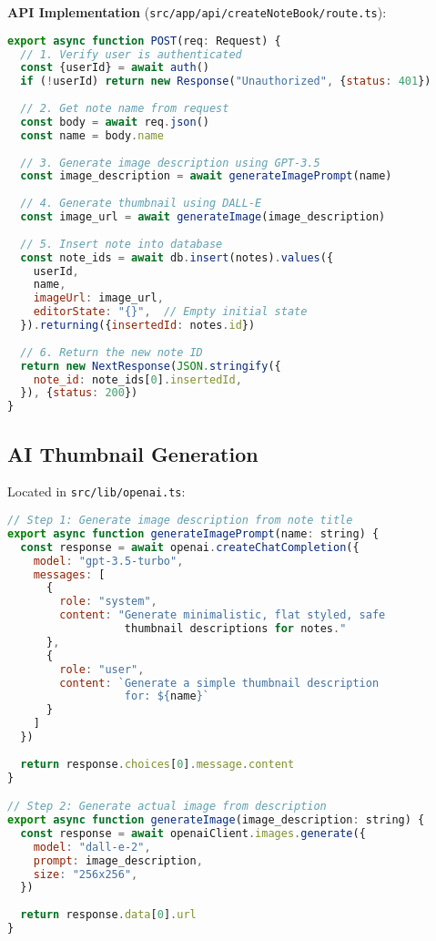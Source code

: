 \documentclass[11pt,a4paper]{article}
\begin{document}
\textbf{API Implementation} (\texttt{src/app/api/createNoteBook/route.ts}):

\begin{lstlisting}[language=JavaScript]
export async function POST(req: Request) {
  // 1. Verify user is authenticated
  const {userId} = await auth()
  if (!userId) return new Response("Unauthorized", {status: 401})
  
  // 2. Get note name from request
  const body = await req.json()
  const name = body.name
  
  // 3. Generate image description using GPT-3.5
  const image_description = await generateImagePrompt(name)
  
  // 4. Generate thumbnail using DALL-E
  const image_url = await generateImage(image_description)
  
  // 5. Insert note into database
  const note_ids = await db.insert(notes).values({
    userId,
    name,
    imageUrl: image_url,
    editorState: "{}",  // Empty initial state
  }).returning({insertedId: notes.id})
  
  // 6. Return the new note ID
  return new NextResponse(JSON.stringify({
    note_id: note_ids[0].insertedId,
  }), {status: 200})
}
\end{lstlisting}


\subsection{AI Thumbnail Generation}

Located in \texttt{src/lib/openai.ts}:

\begin{lstlisting}[language=JavaScript]
// Step 1: Generate image description from note title
export async function generateImagePrompt(name: string) {
  const response = await openai.createChatCompletion({
    model: "gpt-3.5-turbo",
    messages: [
      {
        role: "system", 
        content: "Generate minimalistic, flat styled, safe 
                  thumbnail descriptions for notes."
      },
      {
        role: "user", 
        content: `Generate a simple thumbnail description 
                  for: ${name}`
      }
    ]
  })
  
  return response.choices[0].message.content
}

// Step 2: Generate actual image from description
export async function generateImage(image_description: string) {
  const response = await openaiClient.images.generate({
    model: "dall-e-2",
    prompt: image_description,
    size: "256x256",
  })
  
  return response.data[0].url
}
\end{lstlisting}
\end{document}
